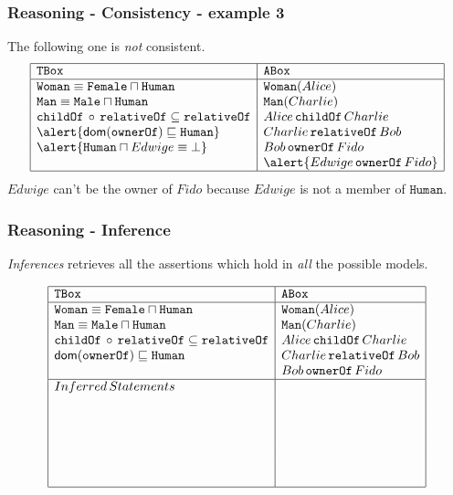 \documentclass[8pt]{beamer}
\newcommand{\TBox}{{\tt TBox}}
\newcommand{\ABox}{{\tt ABox}}
\newcommand{\Human}{\mathtt{Human}}
\newcommand{\Male}{\mathtt{Male}}
\newcommand{\Female}{\mathtt{Female}}
\newcommand{\Man}{\mathtt{Man}}
\newcommand{\Woman}{\mathtt{Woman}}
\newcommand{\relative}{\mathtt{relativeOf}}
\newcommand{\child}{\mathtt{childOf}}
\newcommand{\owner}{\mathtt{ownerOf}}
\newcommand{\Alice}{Alice}
\newcommand{\Bob}{Bob}
\newcommand{\Charlie}{Charlie}
\newcommand{\Edwige}{Edwige}
\newcommand{\Fido}{Fido}
\begin{document}
\begin{frame}
 \frametitle{Reasoning - Consistency - example 3}
 
 The following one is \emph{not} consistent.
 \[
  \begin{array}{|l|l|}
   \hline
   \TBox & \ABox\\
   \hline
   \Woman \equiv \Female \sqcap \Human & \Woman(\Alice)\\
   \Man \equiv \Male \sqcap \Human & \Man(\Charlie)\\
   \child\,\circ\,\relative \subseteq \relative &  \Alice\,\child\,\Charlie\\
   \alert{\dom(\owner) \Issub \Human} & \Charlie\,\relative\,\Bob\\
   \alert{\Human \sqcap \Edwige \equiv \bot}& \Bob\,\owner\,\Fido\\
   & \alert{\Edwige\,\owner\,\Fido}\\
   \hline
  \end{array}
 \]
 $\Edwige$ can't be the owner of $\Fido$ because $\Edwige$ is not a member of $\Human$.
\end{frame}

\begin{frame}
 \frametitle{Reasoning - Inference}

 \emph{Inferences} retrieves all the assertions which hold in \emph{all} the possible models.
 
 \[
  \begin{array}{|l|l|}
   \hline
   \TBox & \ABox\\
   \hline
   \Woman \equiv \Female \sqcap \Human & \Woman(\Alice)\\
   \Man \equiv \Male \sqcap \Human & \Man(\Charlie)\\
   \child\,\circ\,\relative \subseteq \relative &  \Alice\,\child\,\Charlie\\
   \dom(\owner) \Issub \Human & \Charlie\,\relative\,\Bob\\
   & \Bob\,\owner\,\Fido\\
   \hline
   Inferred\,Statements & \\
   \phantom{\Female(\Alice)} & \\
   \phantom{\Human(\Alice)} & \\
   \phantom{\Male(\Charlie)} & \\
   \phantom{\Human(\Charlie)} & \\
   \phantom{\Alice\,\relative\,\Bob} & \\
   \phantom{\Human(\Bob)} & \\
   \hline
  \end{array}
 \]
\end{frame}
\end{document}
